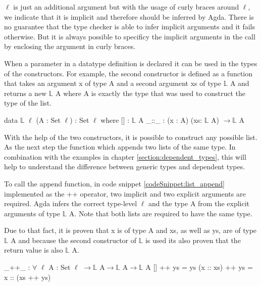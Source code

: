 $\ell$ is just an additional argument but with the usage of curly braces around $\ell$, we indicate that it is implicit and therefore should be inferred by Agda.
There is no guarantee that the type checker is able to infer implicit arguments and it fails otherwise.
But it is always possible to specificy the implicit arguments in the call by enclosing the argument in curly braces\cite{norell:deptyped}.

When a parameter in a datatype definition is declared it can be used in the types of the constructors. 
For example, the second constructor is defined as a function that takes an argument x of type A and a second argument xs of type $\mathbb{L}$ A and returns a new $\mathbb{L}$ A where A is exactly the type that was used to construct the type of the list.
\begin{codesnippet}[mathescape=true, caption={Definition of the list datatype in Agda}, label={codeSnippet:list_datatype}]
data $\mathbb{L}$ {$\ell$} (A : Set $\ell$) : Set $\ell$ where
  [] : $\mathbb{L}$ A
  _::_ : (x : A) (xs: $\mathbb{L}$ A) $\rightarrow \mathbb{L}$ A
\end{codesnippet}

With the help of the two constructors, it is possible to construct any possible list. As the next step the function which appends two lists of the same type. In combination with the examples in chapter \ref{section:dependent_types}, this will help to understand the difference between generic types and dependent types.

To call the append function, in code snippet \ref{codeSnippet:list_append} implemented as the ++ operator, two implicit and two explicit arguments are required. 
Agda infers the correct type-level $\ell$ and the type A from the explicit arguments of type $\mathbb{L}$ A. 
Note that both lists are required to have the same type.

Due to that fact, it is proven that x is of type A and xs, as well as ys, are of type $\mathbb{L}$ A and 
because the second constructor of $\mathbb{L}$ is used its also proven that the return value is also $\mathbb{L}$ A.

\begin{codesnippet}[mathescape=true, caption={Definition of the list append function in Agda}, label={codeSnippet:list_append}]
_++_ : $\forall$ {$\ell$} {A : Set $\ell$} $\rightarrow \mathbb{L}$ A$\rightarrow \mathbb{L}$ A$\rightarrow \mathbb{L}$ A
  []        ++ ys = ys
  (x :: xs) ++ ys = x :: (xs ++ ys)
\end{codesnippet}

